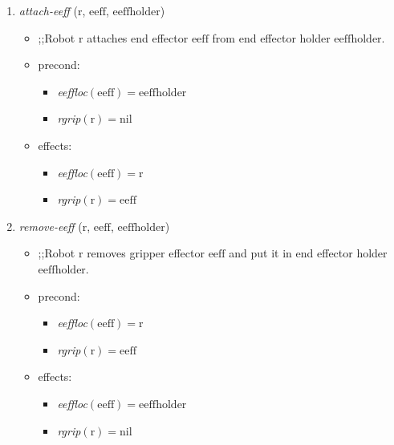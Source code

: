 \begin{small}
\begin{enumerate}
\item \textsl{attach-eeff} ($\mathrm{r}$, $\mathrm{eeff}$, $\mathrm{eeffholder}$)
\begin{itemize}
\item ;;Robot $\mathrm{r}$ attaches end effector $\mathrm{eeff}$ from end effector holder $\mathrm{eeffholder}$.
\item precond:
\begin{itemize}
\item[]\emph{eeffloc}$\mathrm{(eeff)=eeffholder}$
\item[]\emph{rgrip}$\mathrm{(r)=nil}$
\end{itemize}
\item effects:
\begin{itemize}
\item[]\emph{eeffloc}$\mathrm{(eeff)=r}$
\item[]\emph{rgrip}$\mathrm{(r)=eeff}$
\end{itemize}
\end{itemize}

\item \textsl{remove-eeff} ($\mathrm{r}$, $\mathrm{eeff}$, $\mathrm{eeffholder}$)
\begin{itemize}
\item ;;Robot $\mathrm{r}$ removes gripper effector $\mathrm{eeff}$ and put it in end effector holder $\mathrm{eeffholder}$.
\item precond:
\begin{itemize}
\item[]\emph{eeffloc}$\mathrm{(eeff)=r}$
\item[]\emph{rgrip}$\mathrm{(r)=eeff}$
\end{itemize}
\item effects:
\begin{itemize}
\item[]\emph{eeffloc}$\mathrm{(eeff)=eeffholder}$
\item[]\emph{rgrip}$\mathrm{(r)=nil}$
\end{itemize}
\end{itemize}
\end{enumerate}
\end{small}


